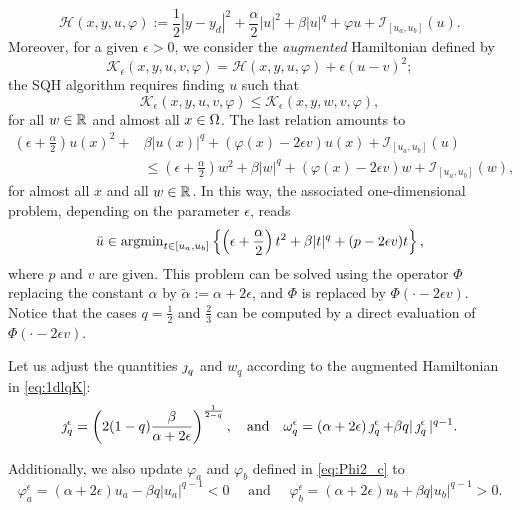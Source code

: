 {\[
\mathcal{H}(x,y,u,\varphi):=\frac{1}{2}|y-y_d|^2+\frac{\alpha}{2}|u|^2+\beta|u|^q+\varphi u +\mathcal{I}_{[u_a,u_b]}(u).
\]
Moreover, for a given $\epsilon>0$, we consider the 
\emph{augmented} Hamiltonian \cite{borzi2023} defined by 
$$\mathcal{K}_\epsilon(x,y,u,v,\varphi)=\mathcal{H}(x,y,u,\varphi)+\epsilon(u-v)^2;$$
%
the SQH algorithm requires finding $u$ such that 
$$	\mathcal{K}_\epsilon(x,y, u,v,\varphi)\leq \mathcal{K}_\epsilon(x,y,w,v,\varphi),
$$
for all $w \in \mathbb{R}$ and almost all $x\in\Omega$. The last relation amounts to
\begin{align*}\label{eq:fonc_K}
	\left(\epsilon+\frac{\alpha}{2}\right) u(x)^2 + & \beta | u(x)|^q + (\varphi(x) -2\epsilon v) u(x) + \mathcal{I}_{[u_a,u_b]}(u) \\
&	\leq \left(\epsilon+\frac{\alpha}{2}\right)w^2 + \beta |w|^q + (\varphi(x) -2\epsilon v) w + \mathcal{I}_{[u_a,u_b]}(w),
\end{align*}
for almost all $x$ and all $w\in \mathbb{R}$. In this way, the associated one-dimensional problem, depending on the parameter $\epsilon$, reads
\begin{equation}\label{eq:1dlqK}
	\bar u \displaystyle\in  \operatorname{argmin}_{t\in [u_a,u_b]} \left\{ \left(\epsilon+\frac{\alpha}{2}\right)t^2 + \beta |t|^q + (p -2\epsilon v) t \right\},
\end{equation}
where $p$ and $v$ are given. This problem can be solved using the operator $\Phi$ replacing the constant $\alpha$ by $\tilde{\alpha}:=\alpha +2\epsilon$, and $\Phi$ is replaced by  $\Phi( \cdot-2\epsilon v)$. Notice that the cases $q=\frac 12$ and $\frac 23$ can be computed by a direct evaluation of  $\Phi( \cdot-2\epsilon v)$. 

Let us adjust the quantities  $\operatorname{\jmath}_q$ and $w_q$ according to the augmented Hamiltonian in \eqref{eq:1dlqK}: 
\begin{equation}
    \operatorname{\jmath}_q^\epsilon = \left( 2(1-q)\frac{\beta}{\alpha +2\epsilon} \right)^{\frac{1}{2-q}}, \quad \text{and} \quad  \omega_q^\epsilon = (\alpha + 2\epsilon)\operatorname{\jmath}_q^\epsilon + \beta q |\operatorname{\jmath}_q^\epsilon|^{q-1}.
\end{equation}

Additionally, we also update $\varphi_a$ and $\varphi_b$ defined in \eqref{eq:Phi2_c} to
\begin{equation}
\varphi^\epsilon_{a} =(\alpha +2\epsilon) u_a -  \beta q  |u_a|^{q-1}<0 \quad \text{ and }  \quad \varphi^\epsilon_{b} =(\alpha +2\epsilon) u_b +  \beta q  |u_b|^{q-1}>0. 
\end{equation}

}
